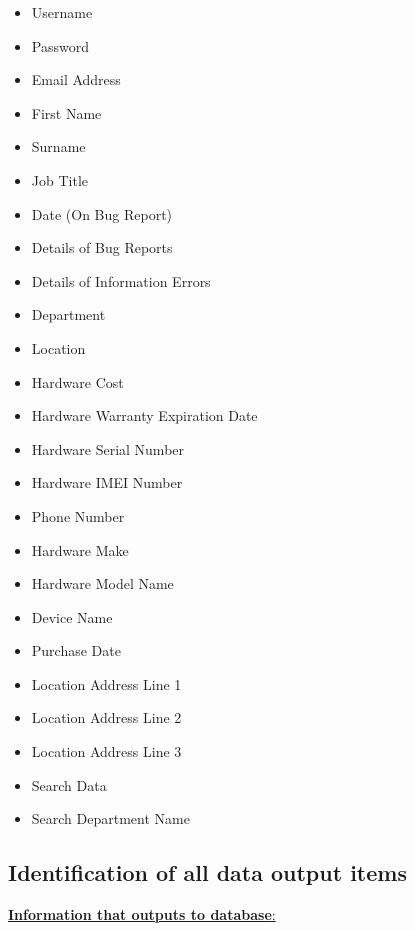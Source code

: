 \begin{itemize}
\item Username
\item Password
\item Email Address
\item First Name
\item Surname
\item Job Title
\item Date (On Bug Report)
\item Details of Bug Reports
\item Details of Information Errors
\item Department
\item Location
\item Hardware Cost
\item Hardware Warranty Expiration Date
\item Hardware Serial Number
\item Hardware IMEI Number
\item Phone Number
\item Hardware Make
\item Hardware Model Name
\item Device Name
\item Purchase Date
\item Location Address Line 1
\item Location Address Line 2
\item Location Address Line 3
\item Search Data
\item Search Department Name
\end{itemize}

\subsection{Identification of all data output items}

\underline {\textbf{Information that outputs to database}:}

